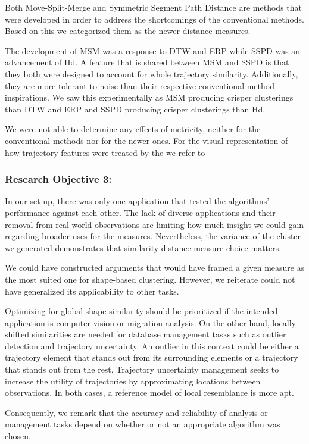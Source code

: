 Both Move-Split-Merge and Symmetric Segment Path Distance are methods that were developed in order to address the shortcomings of the conventional methods.
Based on this we categorized them as the newer distance measures. 


\clearpage
The development of MSM was a response to DTW and ERP while SSPD was an advancement of Hd.
A feature that is shared between MSM and SSPD is that they both were designed to account for whole trajectory similarity.
Additionally, they are more tolerant to noise than their respective conventional method inspirations.
We saw this experimentally as MSM producing crisper clusterings than DTW and ERP and SSPD producing crisper clusterings than Hd.

We were not able to determine any effects of metricity, neither for the conventional methods nor for the newer ones. 
For the visual representation of how trajectory features were treated by the we refer to   


\subsubsection*{Research Objective 3:}
In our set up, there was only one application that tested the algorithms’ performance against each other. 
The lack of diverse applications and their removal from real-world observations are limiting how much insight we could gain regarding broader uses for the measures. Nevertheless, the variance of the cluster we generated demonstrates that similarity distance measure choice matters.

 We could have constructed arguments that would have framed a given measure as the most suited one for shape-based clustering. However, we reiterate could not have generalized its applicability to other tasks.

Optimizing for global shape-similarity should be prioritized if the intended application is computer vision or migration analysis.  
On the other hand, locally shifted similarities are needed for database management tasks such as outlier detection and trajectory uncertainty. An outlier in this context could be either a trajectory element that stands out from its surrounding elements or a trajectory that stands out from the rest. Trajectory uncertainty management seeks to increase the utility of trajectories by approximating locations between observations. 
In both cases, a reference model of local resemblance is more apt.  

Consequently, we remark that the accuracy and reliability of analysis or management tasks depend on whether or not an appropriate algorithm was chosen. 



